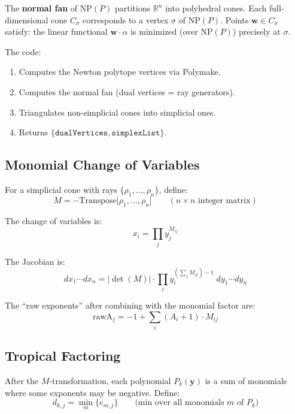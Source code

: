 \documentclass[11pt,a4paper]{article}
\begin{document}
The \textbf{normal fan} of $\mathrm{NP}(P)$ partitions $\mathbb{R}^n$ into polyhedral cones. Each full-dimensional cone $C_\sigma$ corresponds to a vertex $\sigma$ of $\mathrm{NP}(P)$. Points $\mathbf{w} \in C_\sigma$ satisfy: the linear functional $\mathbf{w} \cdot \alpha$ is minimized (over $\mathrm{NP}(P)$) precisely at $\sigma$.

The code:
\begin{enumerate}
  \item Computes the Newton polytope vertices via Polymake.
  \item Computes the normal fan (dual vertices = ray generators).
  \item Triangulates non-simplicial cones into simplicial ones.
  \item Returns $\{\texttt{dualVertices}, \texttt{simplexList}\}$.
\end{enumerate}

\subsection{Monomial Change of Variables}

For a simplicial cone with rays $\{\rho_1, \ldots, \rho_n\}$, define:
\begin{equation}
M = -\mathrm{Transpose}\bigl[\rho_1, \ldots, \rho_n\bigr] \qquad (n \times n \text{ integer matrix})
\end{equation}

The change of variables is:
\begin{equation}
x_i = \prod_j y_j^{M_{ij}}
\end{equation}

The Jacobian is:
\begin{equation}
dx_1 \cdots dx_n = |\det(M)| \cdot \prod_i y_i^{(\sum_j M_{ji}) - 1} \; dy_1 \cdots dy_n
\end{equation}

The ``raw exponents'' after combining with the monomial factor are:
\begin{equation}
\mathrm{rawA}_j = -1 + \sum_i (A_i + 1) \cdot M_{ij}
\end{equation}

\subsection{Tropical Factoring}

After the $M$-transformation, each polynomial $P_k(\mathbf{y})$ is a sum of monomials where some exponents may be negative. Define:
\begin{equation}
d_{k,j} = \min_m \{e_{m,j}\} \qquad \text{(min over all monomials $m$ of $P_k$)}
\end{equation}
\end{document}
